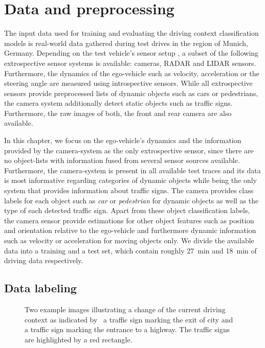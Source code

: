 \section{Data and preprocessing}%
\label{sec:data_and_preprocessing_context_classification}

The input data used for training and evaluating the driving context classification models is real-world data gathered during test drives in the region of Munich, Germany.
Depending on the test vehicle's sensor setup \parencite{Aeberhard2015}, a subset of the following extrospective sensor systems is available: cameras, \ac{RADAR} and \ac{LIDAR} sensors.
Furthermore, the dynamics of the ego-vehicle such as velocity, acceleration or the steering angle are measured using introspective sensors.
While all extrospective sensors provide preprocessed lists of dynamic objects such as cars or pedestrians, the camera system additionally detect static objects such as traffic signs.
Furthermore, the raw images of both, the front and rear camera are also available. 

In this chapter, we focus on the ego-vehicle's dynamics and the information provided by the camera-system as the only extrospective sensor, since there are no object-lists with information fused from several sensor sources available.
Furthermore, the camera-system is present in all available test traces and its data is most informative regarding categories of dynamic objects while being the only system that provides information about traffic signs.
The camera provides class labels for each object such as \emph{car} or \emph{pedestrian} for dynamic objects as well as the type of each detected traffic sign.
Apart from these object classification labels, the camera sensor provide estimations for other object features such as position and orientation relative to the ego-vehicle and furthermore dynamic information such as velocity or acceleration for moving objects only.
We divide the available data into a training and a test set, which contain roughly \SI{27}{\minute} and \SI{18}{\minute} of driving data respectively.

\subsection{Data labeling}%
\label{subsec:data_labeling}

\begin{figure}[t]
    \centering
    \caption{Two example images illustrating a change of the current driving context as indicated by~\protect{} a traffic sign marking the exit of city and~\protect{} a traffic sign marking the entrance to a highway.
    The traffic signs are highlighted by a red rectangle.}
    \label{fig:context_class_manual_labeling}
\end{figure}

